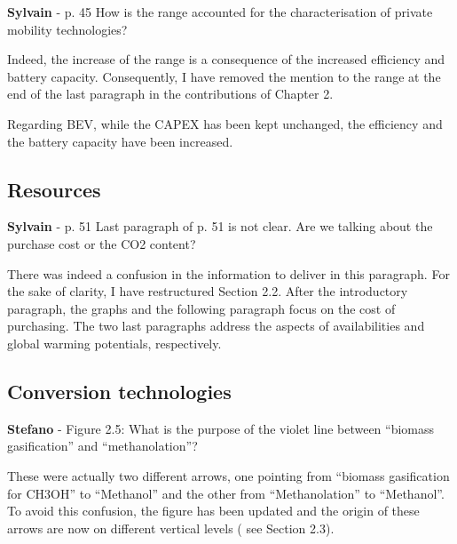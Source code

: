 \documentclass[12pt,a4paper]{article}
\begin{document}
\begin{mdframed}[style=comment] %
{\color{purple} \textbf{Sylvain}} - p. 45 How is the range accounted for the characterisation of private mobility technologies?
\end{mdframed}

\noindent Indeed, the increase of the range is a consequence of the increased efficiency and battery capacity. Consequently, I have removed the mention to the range {\color{blue}at the end of the last paragraph in the contributions of Chapter 2}.

\begin{mdframed}[style=manuscript] %
Regarding BEV, while the CAPEX has been kept unchanged, the efficiency and the battery capacity have been increased. 
\end{mdframed}

\subsection{Resources}
\label{methodo_resources}

\begin{mdframed}[style=comment] %
{\color{purple} \textbf{Sylvain}} - p. 51 Last paragraph of p. 51 is not clear. Are we talking about the purchase cost or the CO2 content?
\end{mdframed}

\noindent There was indeed a confusion in the information to deliver in this paragraph. For the sake of clarity, I have restructured {\color{blue}Section 2.2}. After the introductory paragraph, the graphs and the following paragraph focus on the cost of purchasing. The two last paragraphs address the aspects of availabilities and global warming potentials, respectively.

\subsection{Conversion technologies}
\label{methodo_technologies}

\begin{mdframed}[style=comment] %
{\color{orange} \textbf{Stefano}} - Figure 2.5: What is the purpose of the violet line between ``biomass gasification'' and ``methanolation''?
\end{mdframed}

\noindent These were actually two different arrows, one pointing from ``biomass gasification for CH3OH'' to ``Methanol'' and the other from ``Methanolation'' to ``Methanol''. To avoid this confusion, the figure has been updated and the origin of these arrows are now on different vertical levels ({\color{blue} see Section 2.3}).
\end{document}
